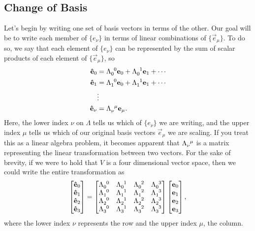 \subsection{Change of Basis}
Let's begin by writing one set of basis vectors in terms of the other.
Our goal will be to write each member of $\{\unit{e}_\nu\}$ in terms of linear combinations of $\{\vec{e}_\mu\}$.
To do so, we say that each element of $\{\unit{e}_\nu\}$ can be represented by the sum of scalar products of each element of $\{\vec{e}_\mu\}$, so
\begin{align*}
    \unit{e}_0 &= \tensor{\Lambda}{_0^0}\vec{e}_0 + \tensor{\Lambda}{_0^1}\vec{e}_1 + \cdots \\
    \unit{e}_1 &= \tensor{\Lambda}{_1^0}\vec{e}_0 + \tensor{\Lambda}{_1^1}\vec{e}_1 + \cdots \\
    &\vdots \\
    \unit{e}_\nu &= \tensor{\Lambda}{_\nu^\mu}\vec{e}_\mu.
\end{align*}
Here, the lower index $\nu$ on $\Lambda$ tells us which of $\{\unit{e}_\nu\}$ we are writing, and the upper index $\mu$ tells us which of our original basis vectors $\vec{e}_\mu$ we are scaling.
If you treat this as a linear algebra problem, it becomes apparent that $\tensor{\Lambda}{_\nu^\mu}$ is a matrix representing the linear transformation between two vectors.
For the sake of brevity, if we were to hold that $V$ is a four dimensional vector space, then we could write the entire transformation as
\[
    \begin{bmatrix}
        \unit{e}_0 \\
        \unit{e}_1 \\
        \unit{e}_2 \\
        \unit{e}_3
    \end{bmatrix} = 
    \begin{bmatrix}
        \tensor{\Lambda}{_0^0} & \tensor{\Lambda}{_0^1} & \tensor{\Lambda}{_0^2} & \tensor{\Lambda}{_0^3} \\
        \tensor{\Lambda}{_1^0} & \tensor{\Lambda}{_1^1} & \tensor{\Lambda}{_1^2} & \tensor{\Lambda}{_1^3} \\
        \tensor{\Lambda}{_2^0} & \tensor{\Lambda}{_2^1} & \tensor{\Lambda}{_2^2} & \tensor{\Lambda}{_2^3} \\
        \tensor{\Lambda}{_3^0} & \tensor{\Lambda}{_3^1} & \tensor{\Lambda}{_3^2} & \tensor{\Lambda}{_3^3}
    \end{bmatrix}
    \begin{bmatrix}
        \vec{e}_0 \\
        \vec{e}_1 \\
        \vec{e}_2 \\
        \vec{e}_3
    \end{bmatrix},
\]
where the lower index $\nu$ represents the row and the upper index $\mu$, the column.

